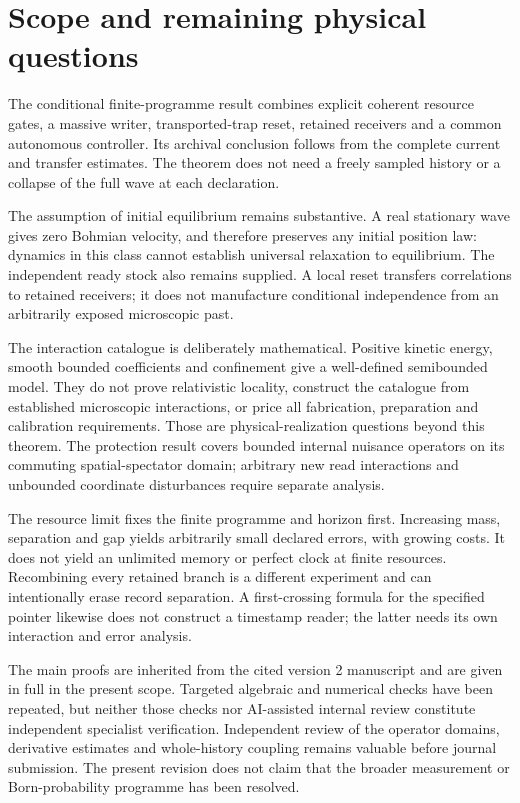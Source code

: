 \documentclass[11pt]{article}
\theoremstyle{definition}\newtheorem{assumption}[theorem]{Constitutive assumption}
\theoremstyle{remark}\newtheorem{remark}[theorem]{Remark}
\begin{document}
\section{Scope and remaining physical questions}
\label{sec:integration}
The conditional finite-programme result combines explicit coherent resource gates, a massive writer, transported-trap reset, retained receivers and a common autonomous controller. Its archival conclusion follows from the complete current and transfer estimates. The theorem does not need a freely sampled history or a collapse of the full wave at each declaration.

The assumption of initial equilibrium remains substantive. A real stationary wave gives zero Bohmian velocity, and therefore preserves any initial position law: dynamics in this class cannot establish universal relaxation to equilibrium. The independent ready stock also remains supplied. A local reset transfers correlations to retained receivers; it does not manufacture conditional independence from an arbitrarily exposed microscopic past.

The interaction catalogue is deliberately mathematical. Positive kinetic energy, smooth bounded coefficients and confinement give a well-defined semibounded model. They do not prove relativistic locality, construct the catalogue from established microscopic interactions, or price all fabrication, preparation and calibration requirements. Those are physical-realization questions beyond this theorem. The protection result covers bounded internal nuisance operators on its commuting spatial-spectator domain; arbitrary new read interactions and unbounded coordinate disturbances require separate analysis.

The resource limit fixes the finite programme and horizon first. Increasing mass, separation and gap yields arbitrarily small declared errors, with growing costs. It does not yield an unlimited memory or perfect clock at finite resources. Recombining every retained branch is a different experiment and can intentionally erase record separation. A first-crossing formula for the specified pointer likewise does not construct a timestamp reader; the latter needs its own interaction and error analysis.

The main proofs are inherited from the cited version 2 manuscript and are given in full in the present scope. Targeted algebraic and numerical checks have been repeated, but neither those checks nor AI-assisted internal review constitute independent specialist verification. Independent review of the operator domains, derivative estimates and whole-history coupling remains valuable before journal submission. The present revision does not claim that the broader measurement or Born-probability programme has been resolved.
\end{document}
